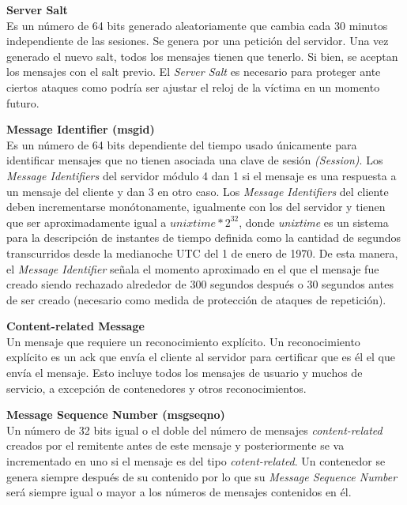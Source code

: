 \begin{description}
	\item  \textbf{Server Salt}\\
	Es un número de 64 bits generado aleatoriamente que cambia cada 30 minutos independiente de las sesiones. Se genera por una petición del servidor. Una vez generado el nuevo salt, todos los mensajes tienen que tenerlo. Si bien, se aceptan los mensajes con el salt previo. El \emph{Server Salt} es necesario para proteger ante ciertos ataques como podría ser ajustar el reloj de la víctima en un momento futuro.

	\item \textbf{Message Identifier (msg\textunderscore id)}\\
	Es un número de 64 bits dependiente del tiempo usado únicamente para identificar mensajes que no tienen asociada una clave de sesión \emph{(Session)}. Los \emph{Message Identifiers} del servidor módulo 4 dan 1 si el mensaje es una respuesta a un mensaje del cliente y dan 3 en otro caso. 
	Los \emph{Message Identifiers} del cliente deben incrementarse monótonamente, igualmente con los del servidor y tienen que ser aproximadamente igual a $unixtime*2^{32}$, donde \emph{unixtime} es un sistema para la descripción de instantes de tiempo definida como la cantidad de segundos transcurridos desde la medianoche UTC del 1 de enero de 1970. 
	De esta manera, el \emph{Message Identifier} señala el momento aproximado en el que el mensaje fue creado siendo rechazado alrededor de 300 segundos después o 30 segundos antes de ser creado (necesario como medida de protección de ataques de repetición).  

	\item \textbf{Content-related Message}\\
	Un mensaje que requiere un reconocimiento explícito. Un reconocimiento explícito es un ack que envía el cliente al servidor para certificar que es él el que envía el mensaje. Esto incluye todos los mensajes de usuario y muchos de servicio, a excepción de contenedores y otros reconocimientos.

	\item \textbf{Message Sequence Number (msg\textunderscore seqno)}\\
	Un número de 32 bits igual o el doble del número de mensajes \emph{content-related} creados por el remitente antes de este mensaje y posteriormente se va incrementado en uno si el mensaje es del tipo \emph{cotent-related}. Un contenedor se genera siempre después de su contenido por lo que su \emph{Message Sequence Number} será siempre igual o mayor a los números de mensajes contenidos en él.


\end{description}
